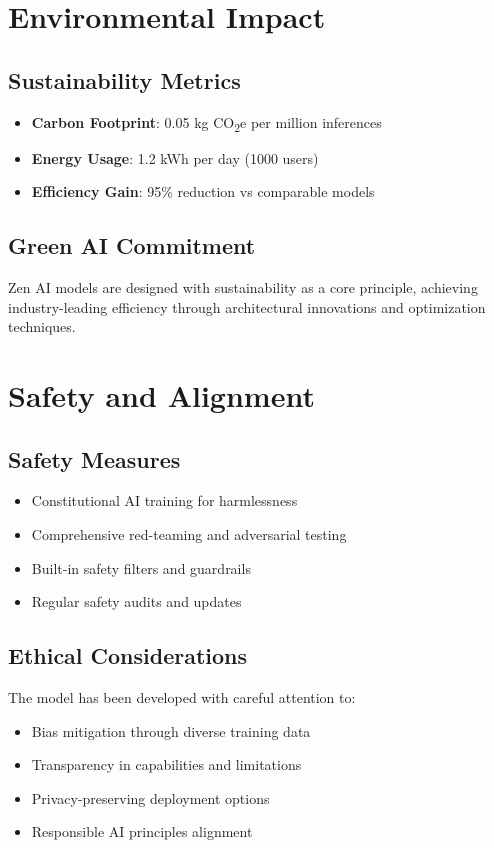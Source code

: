 \documentclass[11pt,a4paper]{article}
\begin{document}
\section{Environmental Impact}

\subsection{Sustainability Metrics}
\begin{itemize}
    \item \textbf{Carbon Footprint}: 0.05 kg CO\textsubscript{2}e per million inferences
    \item \textbf{Energy Usage}: 1.2 kWh per day (1000 users)
    \item \textbf{Efficiency Gain}: 95\% reduction vs comparable models
\end{itemize}

\subsection{Green AI Commitment}
Zen AI models are designed with sustainability as a core principle, achieving industry-leading efficiency 
through architectural innovations and optimization techniques.

\section{Safety and Alignment}

\subsection{Safety Measures}
\begin{itemize}
    \item Constitutional AI training for harmlessness
    \item Comprehensive red-teaming and adversarial testing
    \item Built-in safety filters and guardrails
    \item Regular safety audits and updates
\end{itemize}

\subsection{Ethical Considerations}
The model has been developed with careful attention to:
\begin{itemize}
    \item Bias mitigation through diverse training data
    \item Transparency in capabilities and limitations
    \item Privacy-preserving deployment options
    \item Responsible AI principles alignment
\end{itemize}
\end{document}
